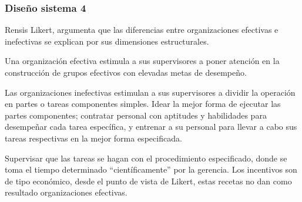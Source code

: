 \subsubsection{Diseño sistema 4}

Rensis Likert, argumenta que las diferencias entre organizaciones efectivas e inefectivas se explican por sus dimensiones estructurales.

Una organización efectiva estimula a sus supervisores a poner atención en la construcción de grupos efectivos con elevadas metas de desempeño.

Las organizaciones inefectivas estimulan a sus supervisores a dividir la operación en partes o tareas componentes simples. Idear la mejor forma de ejecutar las partes componentes; contratar personal con aptitudes y habilidades para desempeñar cada tarea específica, y entrenar a su personal para llevar a cabo sus tareas respectivas en la mejor forma especificada.

Supervisar que las tareas se hagan con el procedimiento especificado, donde se toma el tiempo determinado ``científicamente'' por la gerencia. Los incentivos son de tipo económico, desde el punto de vista de Likert, estas recetas no dan como resultado organizaciones efectivas.

